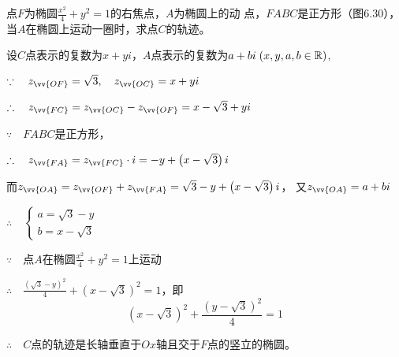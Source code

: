 \begin{example}
点$F$为椭圆$\frac{x^2}{4}+y^2=1$的右焦点，$A$为椭圆上的动
点，$FABC$是正方形（图6.30），当$A$在椭圆上运动一圈时，求点$C$的轨迹。
\end{example}

\begin{solution}
设$C$点表示的复数为$x+yi$，$A$点表示的复数为$a+bi\; (x,y,a,b\in\mathbb{R})$,

$\because\quad z_{\vv{OF}}=\sqrt{3},\quad z_{\vv{OC}}=x+yi$

$\therefore\quad z_{\vv{FC}}=z_{\vv{OC}}-z_{\vv{OF}}=x-\sqrt{3}+yi$

$\because\quad FABC$是正方形，

$\therefore\quad z_{\vv{FA}}=z_{\vv{FC}}\cdot i=-y+\left(x-\sqrt{3}\right)i$

而$z_{\vv{OA}}=z_{\vv{OF}}+z_{\vv{FA}}=\sqrt{3}-y+\left(x-\sqrt{3}\right)i$，
又$z_{\vv{OA}}=a+bi$

\noindent
\begin{minipage}{.55\textwidth}\CTEXindent
$\therefore\quad \begin{cases}
    a=\sqrt{3}-y\\
    b=x-\sqrt{3}
\end{cases}$

$\because\quad $点$A$在椭圆$\frac{x^2}{4}+y^2=1$上运动

$\therefore\quad \frac{\left(\sqrt{3}-y\right)^2}{4}+\left(x-\sqrt{3}\right)^2=1$，即    
\[\left(x-\sqrt{3}\right)^2+\frac{\left(y-\sqrt{3}\right)^2}{4}=1\]
\end{minipage}\hfill
\begin{minipage}{.4\textwidth}
\centering
{}
\end{minipage}

$\therefore\quad C$点的轨迹是长轴垂直于$Ox$轴且交于$F$点的竖立的椭圆。
\end{solution}

